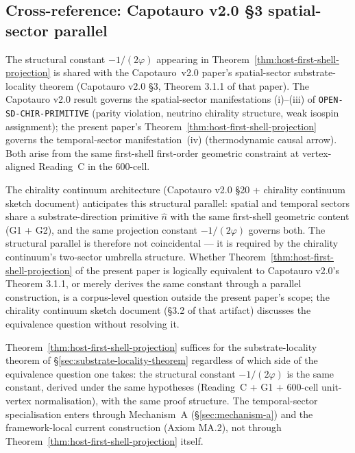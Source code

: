 \documentclass[11pt,letterpaper]{article}
\newcommand{\phig}{\varphi}
\begin{document}
\subsection{Cross-reference: Capotauro v2.0 §3 spatial-sector parallel}
\label{sec:capotauro-cross-reference}

The structural constant $-1/(2\phig)$ appearing in Theorem~\ref{thm:host-first-shell-projection} is shared with the Capotauro~v2.0 paper's spatial-sector substrate-locality theorem (Capotauro v2.0 \S3, Theorem 3.1.1 of that paper). The Capotauro v2.0 result governs the spatial-sector manifestations (i)--(iii) of \texttt{OPEN-SD-CHIR-PRIMITIVE} (parity violation, neutrino chirality structure, weak isospin assignment); the present paper's Theorem~\ref{thm:host-first-shell-projection} governs the temporal-sector manifestation~(iv) (thermodynamic causal arrow). Both arise from the same first-shell first-order geometric constraint at vertex-aligned Reading~C in the 600-cell.

The chirality continuum architecture (Capotauro v2.0 \S20 + chirality continuum sketch document) anticipates this structural parallel: spatial and temporal sectors share a substrate-direction primitive $\hat{n}$ with the same first-shell geometric content (G1 + G2), and the same projection constant $-1/(2\phig)$ governs both. The structural parallel is therefore not coincidental --- it is required by the chirality continuum's two-sector umbrella structure. Whether Theorem~\ref{thm:host-first-shell-projection} of the present paper is logically equivalent to Capotauro v2.0's Theorem 3.1.1, or merely derives the same constant through a parallel construction, is a corpus-level question outside the present paper's scope; the chirality continuum sketch document (\S3.2 of that artifact) discusses the equivalence question without resolving it.

Theorem~\ref{thm:host-first-shell-projection} suffices for the substrate-locality theorem of \S\ref{sec:substrate-locality-theorem} regardless of which side of the equivalence question one takes: the structural constant $-1/(2\phig)$ is the same constant, derived under the same hypotheses (Reading~C + G1 + 600-cell unit-vertex normalisation), with the same proof structure. The temporal-sector specialisation enters through Mechanism~A (\S\ref{sec:mechanism-a}) and the framework-local current construction (Axiom MA.2), not through Theorem~\ref{thm:host-first-shell-projection} itself.

\end{document}
